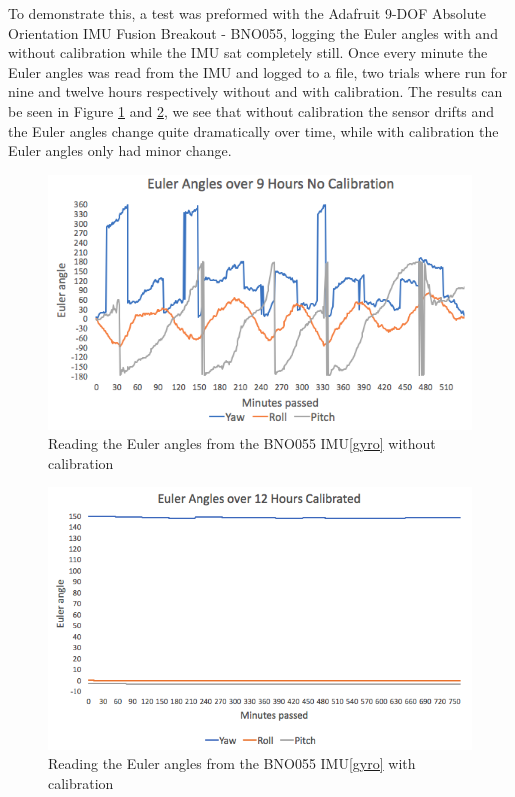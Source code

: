 To demonstrate this, a test was preformed with the Adafruit 9-DOF Absolute Orientation IMU Fusion Breakout - BNO055\cite{gyro}, logging the Euler angles with and without calibration while the IMU sat completely still. Once every minute the Euler angles was read from the IMU and logged to a file, two trials where run for nine and twelve hours respectively without and with calibration. The results can be seen in Figure \ref{drift1} and \ref{drift2}, we see that without calibration the sensor drifts and the Euler angles change quite dramatically over time, while with calibration the Euler angles only had minor change.

\begin{figure}[h!]
    \centering
    \includegraphics[width=1\textwidth]{figures/drift1.png}
    \caption{Reading the Euler angles from the BNO055 IMU\ref{gyro} without calibration}
    \label{drift1}
\end{figure}

\begin{figure}[h!]
    \centering
    \includegraphics[width=1\textwidth]{figures/drift2.png}
    \caption{Reading the Euler angles from the BNO055 IMU\ref{gyro} with calibration}
    \label{drift2}
\end{figure}


